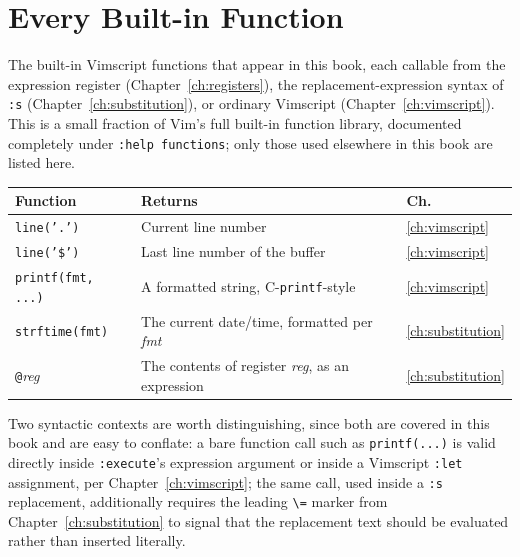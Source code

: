 \chapter{Every Built-in Function}
\label{app:functions}

The built-in Vimscript functions that appear in this book, each callable from the expression register (Chapter~\ref{ch:registers}), the replacement-expression syntax of \texttt{:s} (Chapter~\ref{ch:substitution}), or ordinary Vimscript (Chapter~\ref{ch:vimscript}). This is a small fraction of Vim's full built-in function library, documented completely under \texttt{:help functions}; only those used elsewhere in this book are listed here.

\begin{longtable}{@{}l p{9cm} l@{}}
\textbf{Function} & \textbf{Returns} & \textbf{Ch.} \\
\hline
\endhead
\texttt{line('.')} & Current line number & \ref{ch:vimscript} \\
\texttt{line('\$')} & Last line number of the buffer & \ref{ch:vimscript} \\
\texttt{printf(fmt, ...)} & A formatted string, C-\texttt{printf}-style & \ref{ch:vimscript} \\
\texttt{strftime(fmt)} & The current date/time, formatted per \textit{fmt} & \ref{ch:substitution} \\
\texttt{@}\textit{reg} & The contents of register \textit{reg}, as an expression & \ref{ch:substitution} \\
\end{longtable}

Two syntactic contexts are worth distinguishing, since both are covered in this book and are easy to conflate: a bare function call such as \texttt{printf(...)} is valid directly inside \texttt{:execute}'s expression argument or inside a Vimscript \texttt{:let} assignment, per Chapter~\ref{ch:vimscript}; the same call, used inside a \texttt{:s} replacement, additionally requires the leading \texttt{\textbackslash=} marker from Chapter~\ref{ch:substitution} to signal that the replacement text should be evaluated rather than inserted literally.
